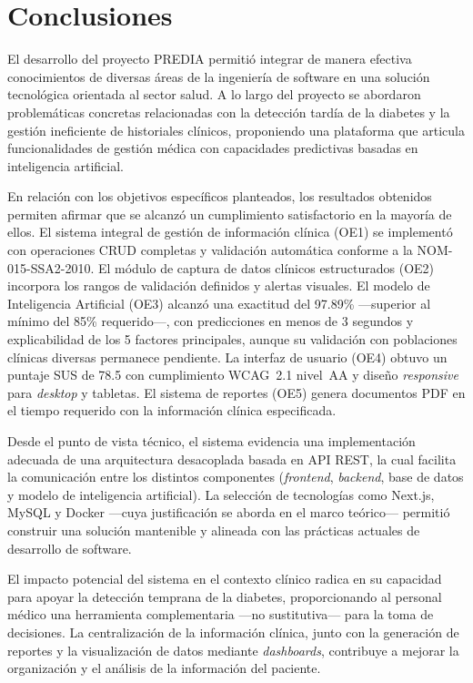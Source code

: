 \documentclass[12pt, letterpaper, twoside]{report}
\begin{document}
\chapter{Conclusiones}

El desarrollo del proyecto PREDIA permitió integrar de manera efectiva conocimientos de diversas áreas de la ingeniería de software en una solución tecnológica orientada al sector salud. A lo largo del proyecto se abordaron problemáticas concretas relacionadas con la detección tardía de la diabetes y la gestión ineficiente de historiales clínicos, proponiendo una plataforma que articula funcionalidades de gestión médica con capacidades predictivas basadas en inteligencia artificial.

En relación con los objetivos específicos planteados, los resultados obtenidos permiten afirmar que se alcanzó un cumplimiento satisfactorio en la mayoría de ellos. El sistema integral de gestión de información clínica (OE1) se implementó con operaciones CRUD completas y validación automática conforme a la NOM-015-SSA2-2010. El módulo de captura de datos clínicos estructurados (OE2) incorpora los rangos de validación definidos y alertas visuales. El modelo de Inteligencia Artificial (OE3) alcanzó una exactitud del 97.89\% ---superior al mínimo del 85\% requerido---, con predicciones en menos de 3 segundos y explicabilidad de los 5 factores principales, aunque su validación con poblaciones clínicas diversas permanece pendiente. La interfaz de usuario (OE4) obtuvo un puntaje SUS de 78.5 con cumplimiento WCAG~2.1 nivel~AA y diseño \textit{responsive} para \textit{desktop} y tabletas. El sistema de reportes (OE5) genera documentos PDF en el tiempo requerido con la información clínica especificada.

Desde el punto de vista técnico, el sistema evidencia una implementación adecuada de una arquitectura desacoplada basada en API REST, la cual facilita la comunicación entre los distintos componentes (\textit{frontend}, \textit{backend}, base de datos y modelo de inteligencia artificial). La selección de tecnologías como Next.js, MySQL y Docker ---cuya justificación se aborda en el marco teórico--- permitió construir una solución mantenible y alineada con las prácticas actuales de desarrollo de software.

El impacto potencial del sistema en el contexto clínico radica en su capacidad para apoyar la detección temprana de la diabetes, proporcionando al personal médico una herramienta complementaria ---no sustitutiva--- para la toma de decisiones. La centralización de la información clínica, junto con la generación de reportes y la visualización de datos mediante \textit{dashboards}, contribuye a mejorar la organización y el análisis de la información del paciente.
\end{document}
